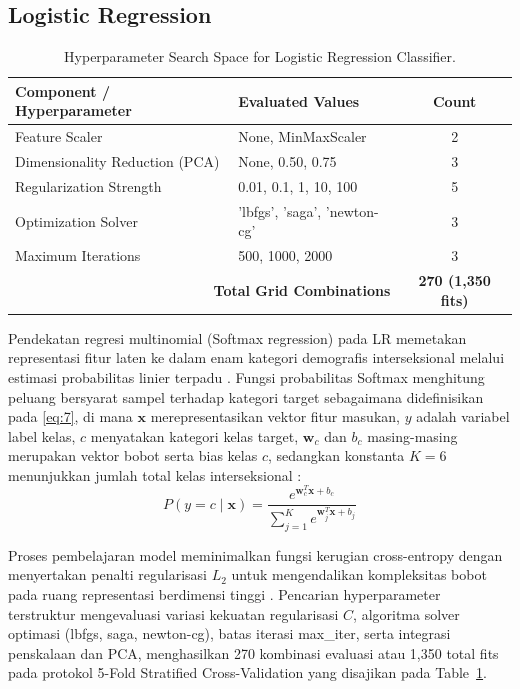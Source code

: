 \subsection{Logistic Regression}
\label{sec:logistic_regression}

\begin{table}[htbp]
\caption{Hyperparameter Search Space for Logistic Regression Classifier.}
\label{tab:V}
\centering
\begin{tabular}{llc}
\toprule
Component / Hyperparameter & Evaluated Values & Count \\
\midrule
Feature Scaler & None, MinMaxScaler & 2 \\
Dimensionality Reduction (PCA) & None, 0.50, 0.75 & 3 \\
Regularization Strength & 0.01, 0.1, 1, 10, 100 & 5 \\
Optimization Solver & 'lbfgs', 'saga', 'newton-cg' & 3 \\
Maximum Iterations & 500, 1000, 2000 & 3 \\
\midrule
\multicolumn{2}{r}{\textbf{Total Grid Combinations}} & \textbf{270 (1,350 fits)} \\
\bottomrule
\end{tabular}
\end{table}

Pendekatan regresi multinomial (Softmax regression) pada LR memetakan representasi fitur laten ke dalam enam kategori demografis interseksional melalui estimasi probabilitas linier terpadu \cite{ref37}. Fungsi probabilitas Softmax menghitung peluang bersyarat sampel terhadap kategori target sebagaimana didefinisikan pada \eqref{eq:7}, di mana $\mathbf{x}$ merepresentasikan vektor fitur masukan, $y$ adalah variabel label kelas, $c$ menyatakan kategori kelas target, $\mathbf{w}_c$ dan $b_c$ masing-masing merupakan vektor bobot serta bias kelas $c$, sedangkan konstanta $K = 6$ menunjukkan jumlah total kelas interseksional \cite{ref38}:
\begin{equation}
P(y = c \mid \mathbf{x}) = \frac{e^{\mathbf{w}_c^T \mathbf{x} + b_c}}{\sum_{j=1}^K e^{\mathbf{w}_j^T \mathbf{x} + b_j}}
\label{eq:7}
\end{equation}

Proses pembelajaran model meminimalkan fungsi kerugian cross-entropy dengan menyertakan penalti regularisasi $L_2$ untuk mengendalikan kompleksitas bobot pada ruang representasi berdimensi tinggi \cite{ref39}. Pencarian hyperparameter terstruktur mengevaluasi variasi kekuatan regularisasi $C$, algoritma solver optimasi (lbfgs, saga, newton-cg), batas iterasi max\_iter, serta integrasi penskalaan dan PCA, menghasilkan 270 kombinasi evaluasi atau 1,350 total fits pada protokol 5-Fold Stratified Cross-Validation yang disajikan pada Table~\ref{tab:V}.
